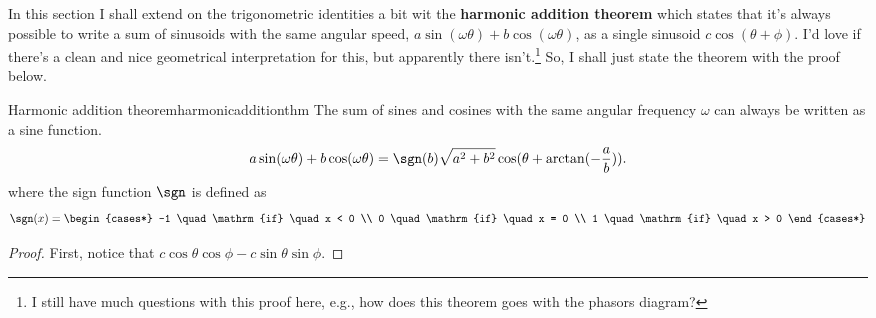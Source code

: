 In this section I shall extend on the trigonometric identities a bit wit the \textbf{harmonic addition theorem} which states that it's always possible to write a sum of sinusoids with the same angular speed, $a\sin(\omega\theta) + b\cos(\omega\theta)$, as a single sinusoid $c\cos(\theta + \phi)$. I'd love if there's a clean and nice geometrical interpretation for this, but apparently there isn't.\footnote{I still have much questions with this proof here, e.g., how does this theorem goes with the phasors diagram?} So, I shall just state the theorem with the proof below.
\begin{thm}{Harmonic addition theorem}{harmonicadditionthm}
    The sum of sines and cosines with the same angular frequency $\omega$ can always be written as a sine function.
    \begin{equation*}
        a\sin(\omega \theta) + b\cos(\omega \theta) = \sgn(b)\sqrt{a^2 + b^2}\cos(\theta + \arctan(-\frac{a}{b})).
    \end{equation*}
    where the sign function $\sgn$ is defined as
    \begin{equation*}
        \sgn(x) = 
        \begin{cases*}
            -1 \quad \mathrm{if} \quad x < 0 \\
            0 \quad \mathrm{if} \quad x = 0 \\
            1 \quad \mathrm{if} \quad x > 0
        \end{cases*}
    \end{equation*}
\end{thm}

\begin{proof}
    First, notice that
    $c\cos\theta\cos\phi - c\sin\theta\sin\phi$.
\end{proof}
